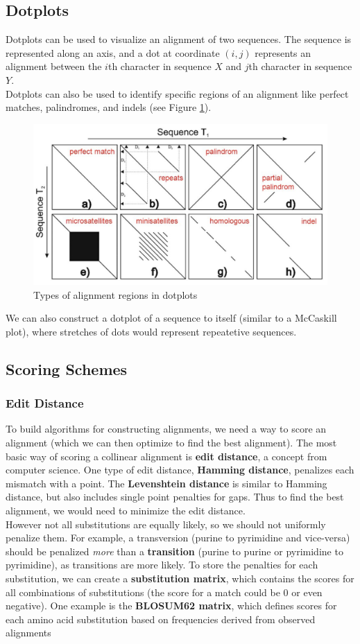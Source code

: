 \documentclass[12pt]{article}
\begin{document}
\subsection{Dotplots}
Dotplots can be used to visualize an alignment of two sequences. The sequence is represented along an axis, and a dot at coordinate $(i,j)$ represents an alignment between the $i$th character in sequence $X$ and $j$th character in sequence $Y$.\\[10pt]
Dotplots can also be used to identify specific regions of an alignment like perfect matches, palindromes, and indels (see Figure \ref{fig:dot}). 
\begin{figure}[h]
    \centering
    \includegraphics[width=.8\linewidth]{seq_dot.png}
    \caption{Types of alignment regions in dotplots}
    \label{fig:dot}
\end{figure}
We can also construct a dotplot of a sequence to itself (similar to a McCaskill plot), where stretches of dots would represent repeatetive sequences.

\subsection{Scoring Schemes}
\subsubsection{Edit Distance}
To build algorithms for constructing alignments, we need a way to score an alignment (which we can then optimize to find the best alignment). The most basic way of scoring a collinear alignment is \textbf{edit distance}, a concept from computer science. One type of edit distance, \textbf{Hamming distance}, penalizes each mismatch with a point. The \textbf{Levenshtein distance} is similar to Hamming distance, but also includes single point penalties for gaps. Thus to find the best alignment, we would need to minimize the edit distance.\\[10pt]
However not all substitutions are equally likely, so we should not uniformly penalize them. For example, a transversion (purine to pyrimidine and vice-versa) should be penalized \textit{more} than a \textbf{transition} (purine to purine or pyrimidine to pyrimidine), as transitions are more likely. To store the penalties for each substitution, we can create a \textbf{substitution matrix}, which contains the scores for all combinations of substitutions (the score for a match could be 0 or even negative). One example is the \textbf{BLOSUM62 matrix}, which defines scores for each amino acid substitution based on frequencies derived from observed alignments
\end{document}
